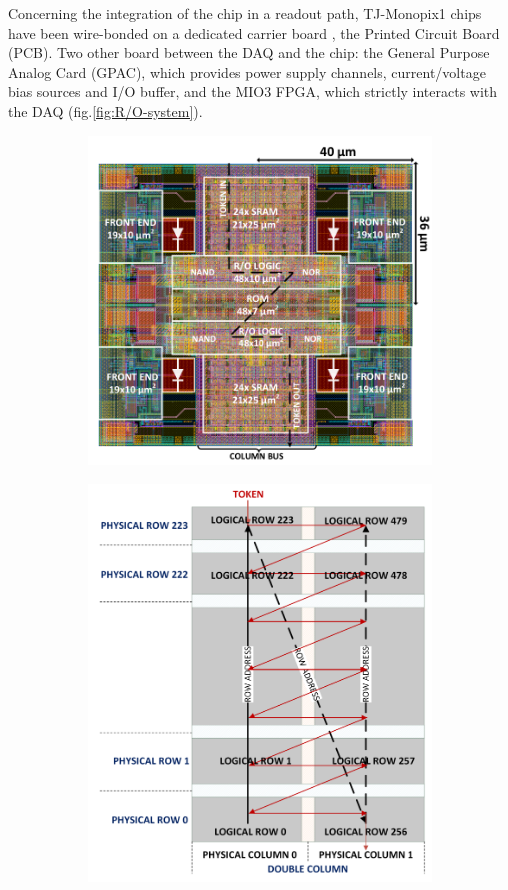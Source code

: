 Concerning the integration of the chip in a readout path, TJ-Monopix1 chips have been wire-bonded on a dedicated carrier board , the Printed Circuit Board (PCB). Two other board between the DAQ and the chip: the General Purpose Analog Card (GPAC), which provides power supply channels, current/voltage bias sources and I/O buffer, and the MIO3 FPGA, which strictly interacts with the DAQ (fig.\ref{fig:R/O-system}).
\begin{figure}[h!]
    \begin{subfigure}{.5\textwidth}
    \centering
    \includegraphics[width=.98\linewidth]{figures/Monopix1/Monopix1_2x2pixelsgroup.png}
    \caption{}
    \label{fig:pixels_core}
    \end{subfigure}
    \begin{subfigure}{.5\textwidth}
    \centering
    \includegraphics[width=.88\linewidth]{figures/Monopix1/column_order.png}

\end{subfigure}
\end{figure}
